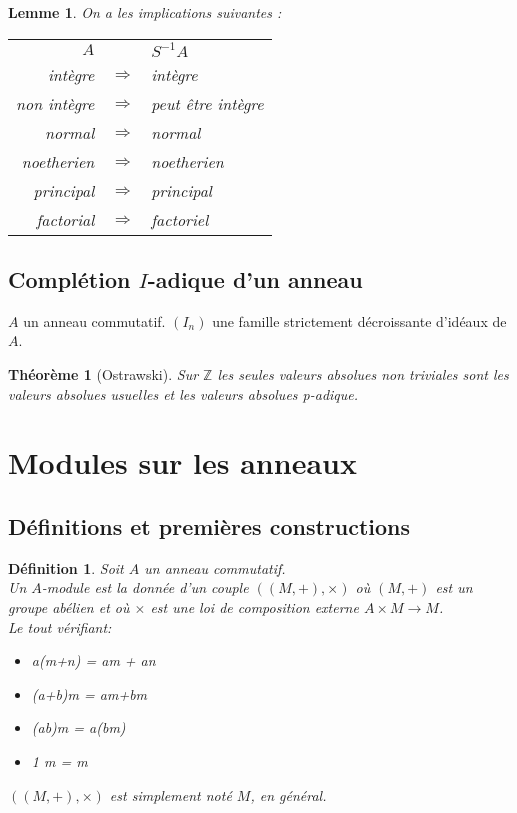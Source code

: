 \documentclass{article}           %
\newcommand\Z{\mathbb{Z}}
\newcommand\sma{S^{-1}A} 			%
\theoremstyle{break}
\theoremstyle{add}
\theoremstyle{break} %
\newtheorem{theoreme}{Théorème}[section]
\newtheorem{lemme}{Lemme}[section]
\newtheorem{definition}{Définition}[section]
\theoremstyle{add}
\begin{document}
\begin{lemme}
On a les implications suivantes : \\
\begin{tabular}{rcl}
$A$ && $\sma$ \\
intègre & $\Longrightarrow$ & intègre \\
non intègre& $\Longrightarrow$ & peut être intègre \\
normal& $\Longrightarrow$ & normal \\
noetherien& $\Longrightarrow$ & noetherien \\
principal& $\Longrightarrow$ & principal \\
factorial& $\Longrightarrow$ & factoriel \\
\end{tabular}
\end{lemme}


\subsection{Complétion $I$-adique d'un anneau}
$A$ un anneau commutatif. $(I_n)$ une famille strictement décroissante d'idéaux de $A$. \\

\begin{theoreme}[Ostrawski]
Sur $\Z$ les seules valeurs absolues non triviales sont les valeurs absolues usuelles et les valeurs absolues p-adique.
\end{theoreme}

\section{Modules sur les anneaux}
\subsection{Définitions et premières constructions}
\begin{definition}
Soit $A$ un anneau commutatif. \\
Un $A$-module est la donnée d'un couple $((M,+), \times)$ où $(M,+)$ est un groupe abélien et où $\times$ est une loi de composition externe $A \times M \rightarrow M$. \\

Le tout vérifiant:
\begin{itemize}
\item a(m+n) = am + an
\item (a+b)m = am+bm
\item (ab)m = a(bm)
\item 1 m = m
\end{itemize}

$((M,+), \times)$ est simplement noté $M$, en général.
\end{definition}
\end{document}

